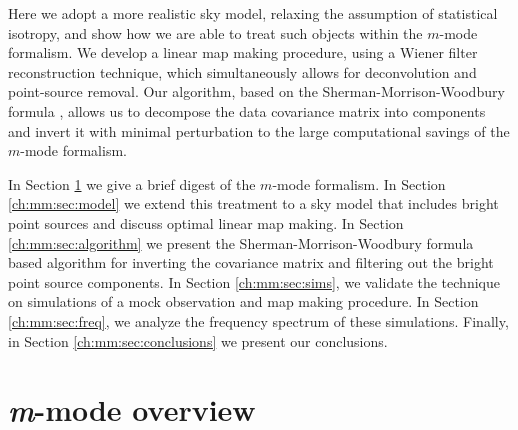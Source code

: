 Here we adopt a more realistic sky model, relaxing the assumption of statistical isotropy, and show how we are able to treat such objects within the $m$-mode formalism. We develop a linear map making procedure, using a Wiener filter reconstruction technique, which simultaneously allows for deconvolution and point-source removal. Our algorithm, based on the Sherman-Morrison-Woodbury formula \citep{smf1, smf2, woodbury}, allows us to decompose the data covariance matrix into components and invert it with minimal perturbation to the large computational savings of the $m$-mode formalism.

In Section \ref{ch:mm:sec:mmo} we give a brief digest of the $m$-mode formalism. In Section \ref{ch:mm:sec:model} we extend this treatment to a sky model that includes bright point sources and discuss optimal linear map making. In Section \ref{ch:mm:sec:algorithm} we present the Sherman-Morrison-Woodbury formula based algorithm for inverting the covariance matrix and filtering out the bright point source components. In Section \ref{ch:mm:sec:sims}, we validate the technique on simulations of a mock observation and map making procedure. In Section \ref{ch:mm:sec:freq}, we analyze the frequency spectrum of these simulations. Finally, in Section \ref{ch:mm:sec:conclusions} we present our conclusions.

\section{\textit{m}-mode overview}
\label{ch:mm:sec:mmo}

